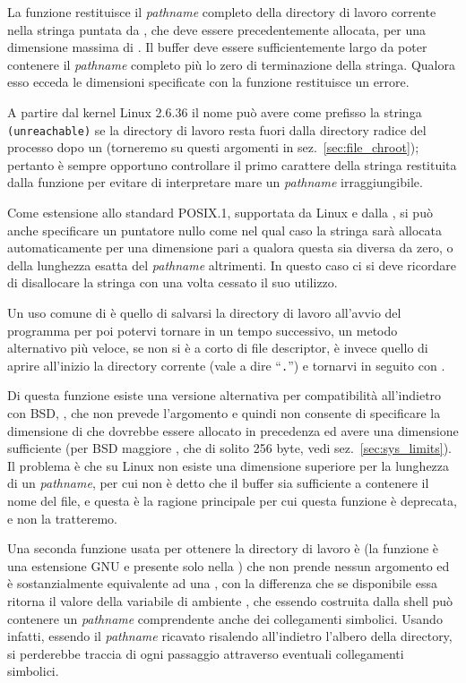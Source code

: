 La funzione restituisce il \textit{pathname} completo della directory di
lavoro corrente nella stringa puntata da , che deve essere
precedentemente allocata, per una dimensione massima di .  Il
buffer deve essere sufficientemente largo da poter contenere il
\textit{pathname} completo più lo zero di terminazione della stringa. Qualora
esso ecceda le dimensioni specificate con  la funzione restituisce
un errore.

A partire dal kernel Linux 2.6.36 il nome può avere come prefisso la stringa
\texttt{(unreachable)} se la directory di lavoro resta fuori dalla directory
radice del processo dopo un  (torneremo su questi argomenti in
sez.~\ref{sec:file_chroot}); pertanto è sempre opportuno controllare il primo
carattere della stringa restituita dalla funzione per evitare di interpretare
mare un \textit{pathname} irraggiungibile.

Come estensione allo standard POSIX.1, supportata da Linux e dalla
, si può anche specificare un puntatore nullo come 
nel qual caso la stringa sarà allocata automaticamente per una dimensione pari
a  qualora questa sia diversa da zero, o della lunghezza esatta
del \textit{pathname} altrimenti. In questo caso ci si deve ricordare di
disallocare la stringa con  una volta cessato il suo utilizzo.

Un uso comune di  è quello di salvarsi la directory di lavoro
all'avvio del programma per poi potervi tornare in un tempo successivo, un
metodo alternativo più veloce, se non si è a corto di file descriptor, è
invece quello di aprire all'inizio la directory corrente (vale a dire
``\texttt{.}'') e tornarvi in seguito con .

Di questa funzione esiste una versione alternativa per compatibilità
all'indietro con BSD, , che non prevede l'argomento 
e quindi non consente di specificare la dimensione di  che
dovrebbe essere allocato in precedenza ed avere una dimensione sufficiente
(per BSD maggiore , che di solito 256 byte, vedi
sez.~\ref{sec:sys_limits}). Il problema è che su Linux non esiste una
dimensione superiore per la lunghezza di un \textit{pathname}, per cui non è
detto che il buffer sia sufficiente a contenere il nome del file, e questa è
la ragione principale per cui questa funzione è deprecata, e non la tratteremo.

Una seconda funzione usata per ottenere la directory di lavoro è
 (la funzione è una estensione GNU e presente
solo nella ) che non prende nessun argomento ed è sostanzialmente
equivalente ad una , con la differenza che se
disponibile essa ritorna il valore della variabile di ambiente ,
che essendo costruita dalla shell può contenere un \textit{pathname}
comprendente anche dei collegamenti simbolici. Usando  infatti,
essendo il \textit{pathname} ricavato risalendo all'indietro l'albero della
directory, si perderebbe traccia di ogni passaggio attraverso eventuali
collegamenti simbolici.

